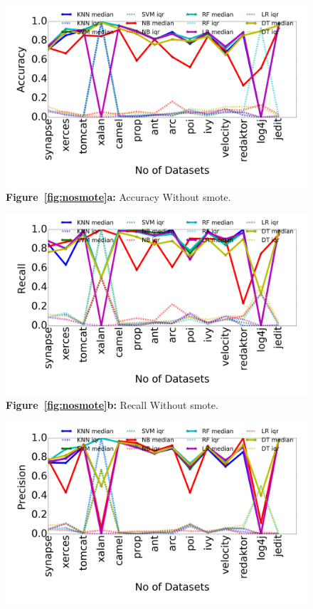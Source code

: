 \documentclass[conference]{IEEEtran}
\begin{document}
\begin{figure}[!htbp]
    \centering
    \begin{minipage}[b]{0.49\linewidth}
        \begin{center}
        \includegraphics[width=\linewidth]{Accuracy_nosmote.png}
  {\bf Figure~\ref{fig:nosmote}a:} Accuracy Without smote.
  \end{center}
    \end{minipage}%
    \begin{minipage}[b]{0.49\linewidth}
        \begin{center}
        \includegraphics[width=\linewidth]{Recall_nosmote.png}
  {\bf Figure~\ref{fig:nosmote}b:} Recall Without smote.
  \end{center}
    \end{minipage}
    \begin{minipage}[b]{0.49\linewidth}
        \begin{center}
        \includegraphics[width=\linewidth]{Precision_nosmote.png}

\end{center}
\end{minipage}
\end{figure}
\end{document}
